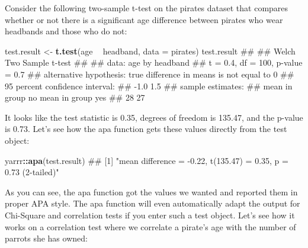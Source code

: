 \documentclass[]{book}
\newenvironment{Shaded}{\begin{snugshade}}{\end{snugshade}}
\newcommand{\KeywordTok}[1]{\textcolor[rgb]{0.13,0.29,0.53}{\textbf{#1}}}
\newcommand{\DataTypeTok}[1]{\textcolor[rgb]{0.13,0.29,0.53}{#1}}
\newcommand{\StringTok}[1]{\textcolor[rgb]{0.31,0.60,0.02}{#1}}
\newcommand{\OperatorTok}[1]{\textcolor[rgb]{0.81,0.36,0.00}{\textbf{#1}}}
\newcommand{\NormalTok}[1]{#1}
\theoremstyle{definition}
\theoremstyle{definition}
\theoremstyle{remark}
\begin{document}
Consider the following two-sample t-test on the pirates dataset that
compares whether or not there is a significant age difference between
pirates who wear headbands and those who do not:

\begin{Shaded}
\begin{Highlighting}[]
\NormalTok{test.result <-}\StringTok{ }\KeywordTok{t.test}\NormalTok{(age }\OperatorTok{~}\StringTok{ }\NormalTok{headband,}
                      \DataTypeTok{data =}\NormalTok{ pirates)}
\NormalTok{test.result}
\NormalTok{## }
\NormalTok{##  Welch Two Sample t-test}
\NormalTok{## }
\NormalTok{## data:  age by headband}
\NormalTok{## t = 0.4, df = 100, p-value = 0.7}
\NormalTok{## alternative hypothesis: true difference in means is not equal to 0}
\NormalTok{## 95 percent confidence interval:}
\NormalTok{##  -1.0  1.5}
\NormalTok{## sample estimates:}
\NormalTok{##  mean in group no mean in group yes }
\NormalTok{##                28                27}
\end{Highlighting}
\end{Shaded}

It looks like the test statistic is 0.35, degrees of freedom is 135.47,
and the p-value is 0.73. Let's see how the apa function gets these
values directly from the test object:

\begin{Shaded}
\begin{Highlighting}[]
\NormalTok{yarrr}\OperatorTok{::}\KeywordTok{apa}\NormalTok{(test.result)}
\NormalTok{## [1] "mean difference = -0.22, t(135.47) = 0.35, p = 0.73 (2-tailed)"}
\end{Highlighting}
\end{Shaded}

As you can see, the apa function got the values we wanted and reported
them in proper APA style. The apa function will even automatically adapt
the output for Chi-Square and correlation tests if you enter such a test
object. Let's see how it works on a correlation test where we correlate
a pirate's age with the number of parrots she has owned:
\end{document}
